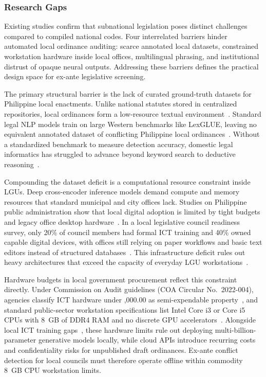     
        \subsubsection{Research Gaps}
        Existing studies confirm that subnational legislation poses distinct challenges compared to compiled national codes. Four interrelated barriers hinder automated local ordinance auditing: scarce annotated local datasets, constrained workstation hardware inside local offices, multilingual phrasing, and institutional distrust of opaque neural outputs. Addressing these barriers defines the practical design space for ex-ante legislative screening.

        The primary structural barrier is the lack of curated ground-truth datasets for Philippine local enactments. Unlike national statutes stored in centralized repositories, local ordinances form a low-resource textual environment~\cite{ranathunga2022some}. Standard legal NLP models train on large Western benchmarks like LexGLUE, leaving no equivalent annotated dataset of conflicting Philippine local ordinances~\cite{gabuya2025towardsdigitallegis, nrcp2024review}. Without a standardized benchmark to measure detection accuracy, domestic legal informatics has struggled to advance beyond keyword search to deductive reasoning~\cite{gabuya2025towardsdigitallegis}.

        Compounding the dataset deficit is a computational resource constraint inside LGUs. Deep cross-encoder inference models demand compute and memory resources that standard municipal and city offices lack. Studies on Philippine public administration show that local digital adoption is limited by tight budgets and legacy office desktop hardware~\cite{gabuya2025towardsdigitallegis}. In a local legislative council readiness survey, only 20\% of council members had formal ICT training and 40\% owned capable digital devices, with offices still relying on paper workflows and basic text editors instead of structured databases~\cite{gabuya2025towardsdigitallegis}. This infrastructure deficit rules out heavy architectures that exceed the capacity of everyday LGU workstations~\cite{huangetal2025integrated}.

        Hardware budgets in local government procurement reflect this constraint directly. Under Commission on Audit guidelines (COA Circular No.~2022-004), agencies classify ICT hardware under ,000.00 as semi-expendable property~\cite{coa2022circular004}, and standard public-sector workstation specifications list Intel Core i3 or Core i5 CPUs with 8~GB of DDR4 RAM and no discrete GPU accelerators~\cite{dict2020specs}. Alongside local ICT training gaps~\cite{gabuya2025towardsdigitallegis}, these hardware limits rule out deploying multi-billion-parameter generative models locally, while cloud APIs introduce recurring costs and confidentiality risks for unpublished draft ordinances. Ex-ante conflict detection for local councils must therefore operate offline within commodity 8~GB CPU workstation limits.

